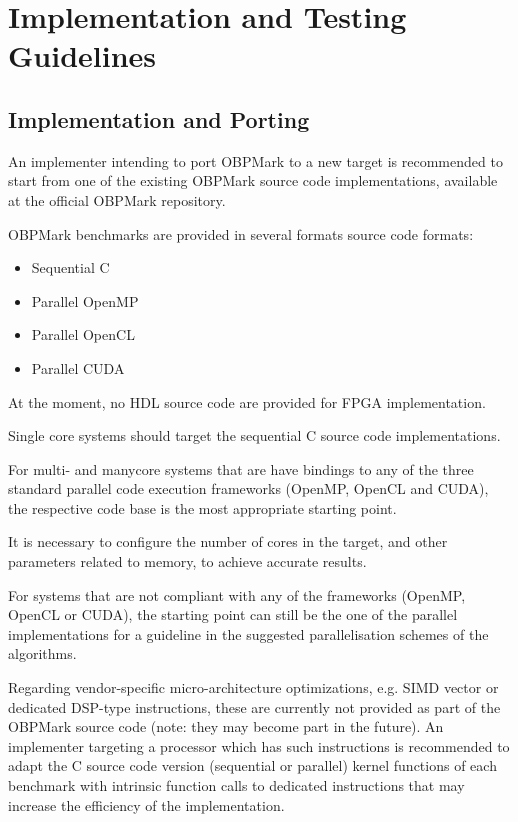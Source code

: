 \chapter{Implementation and Testing Guidelines}

\section{Implementation and Porting}

An implementer intending to port OBPMark to a new target is recommended to start from one of the existing OBPMark source code implementations, available at the official OBPMark repository.

OBPMark benchmarks are provided in several formats source code formats: 

\begin{itemize}
    \item Sequential C
    \item Parallel OpenMP
    \item Parallel OpenCL
    \item Parallel CUDA
\end{itemize}

At the moment, no HDL source code are provided for FPGA implementation.
\newline

Single core systems should target the sequential C source code implementations. 

For multi- and manycore systems that are have bindings to any of the three standard parallel code execution frameworks (OpenMP, OpenCL and CUDA), the respective code base is the most appropriate starting point. 

It is necessary to configure the number of cores in the target, and other parameters related to memory, to achieve accurate results. 

For systems that are not compliant with any of the frameworks (OpenMP, OpenCL or CUDA), the starting point can still be the one of the parallel implementations for a guideline in the suggested parallelisation schemes of the algorithms. 
\newline

Regarding vendor-specific micro-architecture optimizations, e.g. SIMD vector or dedicated DSP-type instructions, these are currently not provided as part of the OBPMark source code (note: they may become part in the future). An implementer targeting a processor which has such instructions is recommended to adapt the C source code version (sequential or parallel) kernel functions of each benchmark with intrinsic function calls to dedicated instructions that may increase the efficiency of the implementation. 

